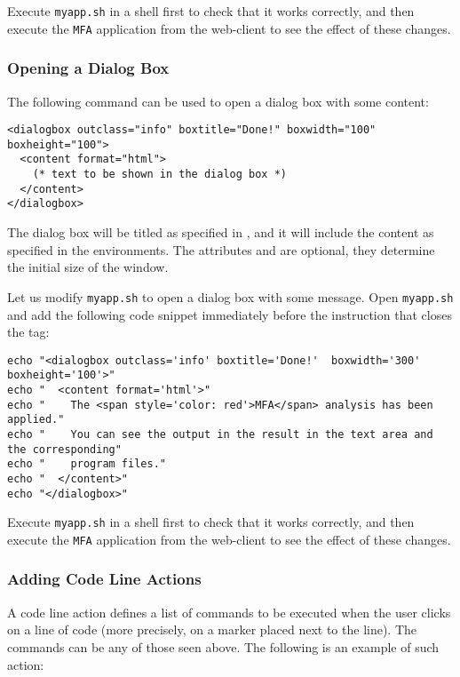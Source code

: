 \medskip
\noindent
Execute \texttt{myapp.sh} in a shell first to check that it works
correctly, and then execute the \texttt{MFA} application from the
web-client to see the effect of these changes.


\subsubsection{Opening a Dialog Box}

The following command can be used to open a dialog box with some
content:

\medskip
\begin{lstlisting}
<dialogbox outclass="info" boxtitle="Done!" boxwidth="100" boxheight="100"> 
  <content format="html">
    (* text to be shown in the dialog box *)
  </content>
</dialogbox>
\end{lstlisting}

\medskip 
\noindent 
The dialog box will be titled as specified in , and it
will include the content as specified in the 
environments. The attributes  and  are
optional, they determine the initial size of the window.

Let us modify \texttt{myapp.sh} to open a dialog box with some
message. Open \texttt{myapp.sh} and add the following code snippet
immediately before the instruction that closes the 
tag:

\medskip
\begin{lstlisting}[style=script]
echo "<dialogbox outclass='info' boxtitle='Done!'  boxwidth='300' boxheight='100'>"
echo "  <content format='html'>"
echo "    The <span style='color: red'>MFA</span> analysis has been applied."
echo "    You can see the output in the result in the text area and the corresponding"
echo "    program files."
echo "  </content>"
echo "</dialogbox>"
\end{lstlisting}

\medskip
\noindent
Execute \texttt{myapp.sh} in a shell first to check that it works
correctly, and then execute the \texttt{MFA} application from the
web-client to see the effect of these changes.


\subsubsection{Adding Code Line Actions}

A code line action defines a list of commands to be executed when the
user clicks on a line of code (more precisely, on a marker placed next
to the line). The commands can be any of those seen above. The
following is an example of such action:

